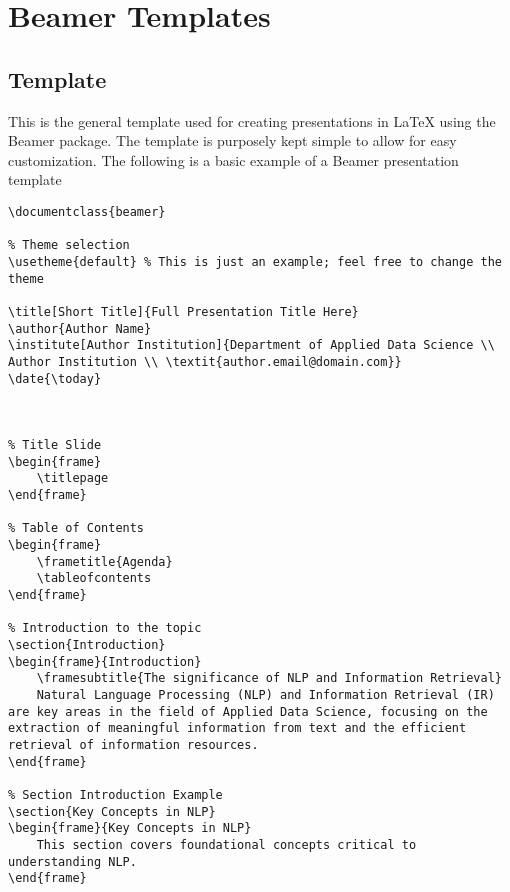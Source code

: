 \chapter{Beamer Templates}

\section{Template}
This is the general template used for creating presentations in \LaTeX{} using the Beamer package. The template is purposely kept simple to allow for easy customization. The following is a basic example of a Beamer presentation template

\begin{verbatim}
\documentclass{beamer}

% Theme selection
\usetheme{default} % This is just an example; feel free to change the theme

\title[Short Title]{Full Presentation Title Here}
\author{Author Name}
\institute[Author Institution]{Department of Applied Data Science \\ Author Institution \\ \textit{author.email@domain.com}}
\date{\today}



% Title Slide
\begin{frame}
    \titlepage
\end{frame}

% Table of Contents
\begin{frame}
    \frametitle{Agenda}
    \tableofcontents
\end{frame}

% Introduction to the topic
\section{Introduction}
\begin{frame}{Introduction}
    \framesubtitle{The significance of NLP and Information Retrieval}
    Natural Language Processing (NLP) and Information Retrieval (IR) are key areas in the field of Applied Data Science, focusing on the extraction of meaningful information from text and the efficient retrieval of information resources.
\end{frame}

% Section Introduction Example
\section{Key Concepts in NLP}
\begin{frame}{Key Concepts in NLP}
    This section covers foundational concepts critical to understanding NLP.
\end{frame}


\end{verbatim}
